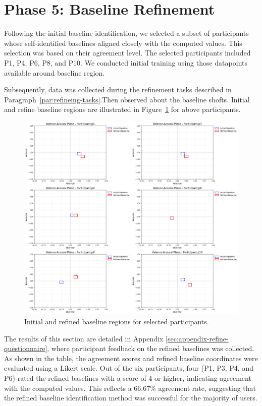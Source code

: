 \section{Phase 5: Baseline Refinement}
\label{sec:baseline-refinement}

Following the initial baseline identification, we selected a subset of participants whose self-identified baselines aligned closely with the computed values. This selection was based on their agreement level. The selected participants included P1, P4, P6, P8, and P10. We conducted initial training using those datapoints available around baseline region. 

Subsequently, data was collected during the refinement tasks described in Paragraph~\ref{par:refineing-tasks}.Then observed about the baseline shofts. Initial and refine baseline regions are illustrated in Figure~\ref{fig:baseline-refine-all} for above participants.

\begin{figure}[h]
    \centering
    \includegraphics[width=1\textwidth]{img/chapter_04/b-refine/baseline-refine-all.png}
    \caption{Initial and refined baseline regions for selected participants.}
    \label{fig:baseline-refine-all}
\end{figure}


The results of this section are detailed in Appendix \ref{sec:appendix-refine-questionnaire}, where participant feedback on the refined baselines was collected. As shown in the table, the agreement scores and refined baseline coordinates were evaluated using a Likert scale. Out of the six participants, four (P1, P3, P4, and P6) rated the refined baselines with a score of 4 or higher, indicating agreement with the computed values. This reflects a 66.67\% agreement rate, suggesting that the refined baseline identification method was successful for the majority of users.

